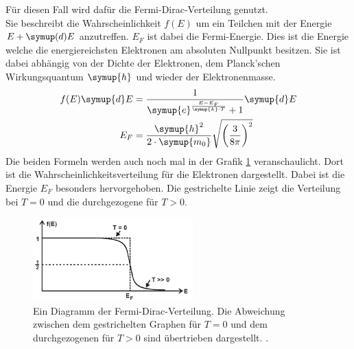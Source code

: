 Für diesen Fall wird dafür die Fermi-Dirac-Verteilung genutzt.\\
Sie beschreibt die Wahrscheinlichkeit $f(E)$ um ein Teilchen mit der Energie $E + \symup(d)E$ anzutreffen.
$E_F$ ist dabei die Fermi-Energie. Dies ist die Energie welche die energiereichsten Elektronen am absoluten Nullpunkt besitzen.
Sie ist dabei abhängig von der Dichte der Elektronen, dem Planck'schen Wirkungsquantum \cite{Planck} $\symup{h}$ und wieder der Elektronenmasse.\\
\begin{align}
  f(E)\symup{d}E &= \frac{1}{\symup{e}^{\frac{E-E_F}{\symup{k} \cdot T}}+1} \symup{d}E \label{eqn:fermidirac}\\
  E_F &= \frac{\symup{h}^2}{2 \cdot \symup{m_0}}\sqrt{\left(\frac{3}{8\pi}\right)^2} \label{eqn:E_F}
\end{align} 
Die beiden Formeln werden auch noch mal in der Grafik \ref{img:fermi} veranschaulicht.
Dort ist die Wahrscheinlichkeitsverteilung für die Elektronen dargestellt. 
Dabei ist die Energie $E_F$ besonders hervorgehoben.
Die gestrichelte Linie zeigt die Verteilung bei $T=0$ und die durchgezogene für $T>0$.

\begin{figure}[H]
  \centering
  \includegraphics[width=0.55\textwidth]{images/dirac.PNG}
  \caption{Ein Diagramm der Fermi-Dirac-Verteilung. Die Abweichung zwischen dem gestrichelten Graphen für $T=0$ 
  und dem durchgezogenen für $T>0$ sind übertrieben dargestellt.  \protect \cite{V311}.}
  \label{img:fermi}
\end{figure}

